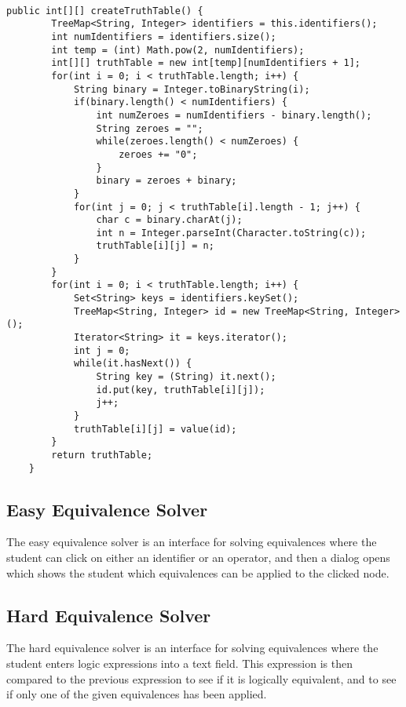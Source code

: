 \documentclass{report}
\begin{document}
\begin{verbatim}

public int[][] createTruthTable() {
		TreeMap<String, Integer> identifiers = this.identifiers();
		int numIdentifiers = identifiers.size();
		int temp = (int) Math.pow(2, numIdentifiers);
		int[][] truthTable = new int[temp][numIdentifiers + 1];
		for(int i = 0; i < truthTable.length; i++) {
			String binary = Integer.toBinaryString(i);
			if(binary.length() < numIdentifiers) {
				int numZeroes = numIdentifiers - binary.length();
				String zeroes = "";
				while(zeroes.length() < numZeroes) {
					zeroes += "0";
				}
				binary = zeroes + binary;
			}
			for(int j = 0; j < truthTable[i].length - 1; j++) {
				char c = binary.charAt(j);
				int n = Integer.parseInt(Character.toString(c));
				truthTable[i][j] = n;
			}
		}
		for(int i = 0; i < truthTable.length; i++) {
			Set<String> keys = identifiers.keySet();
			TreeMap<String, Integer> id = new TreeMap<String, Integer>();
			Iterator<String> it = keys.iterator();
			int j = 0;
			while(it.hasNext()) {
				String key = (String) it.next();
				id.put(key, truthTable[i][j]);
				j++;
			}
			truthTable[i][j] = value(id);
		}
		return truthTable;
	}

\end{verbatim}



\subsection{Easy Equivalence Solver}

The easy equivalence solver is an interface for solving equivalences where
the student can click on either an identifier or an operator, and then a dialog
opens which shows the student which equivalences can be applied to the clicked
node. 


\subsection{Hard Equivalence Solver}

The hard equivalence solver is an interface for solving equivalences where
the student enters logic expressions into a text field. This expression is
then compared to the previous expression to see if it is logically equivalent,
and to see if only one of the given equivalences has been applied. 

\end{document}

